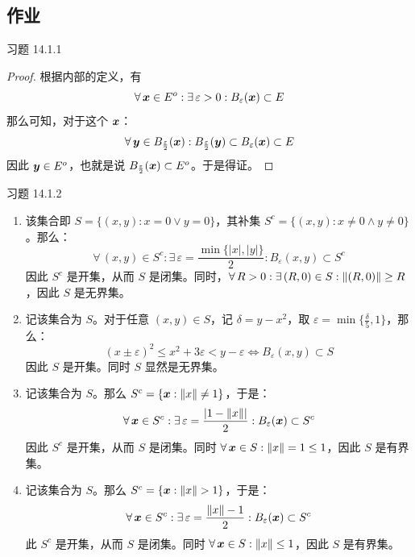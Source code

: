 \subsection{作业}

\begin{problem}
    习题 14.1.1
    \begin{proof}
        根据内部的定义，有
        $$
        \forall\,\boldsymbol{x} \in E^o: \exists\,\varepsilon > 0: B_{\varepsilon}(\boldsymbol{x}) \subset E
        $$
        那么可知，对于这个 $\boldsymbol{x}$：
        $$
        \forall\,\boldsymbol{y} \in B_{\frac{\varepsilon}{2}}(\boldsymbol{x}): B_{\frac{\varepsilon}{2}}(\boldsymbol{y}) \subset B_{\varepsilon}(\boldsymbol{x}) \subset E
        $$
        因此 $\boldsymbol{y} \in E^o$，也就是说 $B_{\frac{\varepsilon}{2}}(\boldsymbol{x}) \subset E^o$。于是得证。
    \end{proof}
\end{problem}

\begin{problem}
    习题 14.1.2
    \begin{solution}
        \begin{enumerate}
            \item[\textbf{1)}] 该集合即 $S = \{(x, y): x = 0 \lor y = 0\}$，其补集 $S^c = \{(x, y): x \neq 0 \land y \neq 0\}$。那么：
            $$
            \forall\,(x, y) \in S^c: \exists\,\varepsilon = \frac{\min\{|x|, |y|\}}{2}: B_{\varepsilon}(x, y) \subset S^c
            $$
            因此 $S^c$ 是开集，从而 $S$ 是闭集。同时，$\forall\,R > 0: \exists\, (R, 0) \in S: \norm{(R, 0)} \ge R$，因此 $S$ 是无界集。
            
            \item[\textbf{2)}] 记该集合为 $S$。对于任意 $(x, y) \in S$，记 $\delta = y - x^2$，取 $\varepsilon = \min\{\frac{\delta}{5}, 1\}$，那么：
            $$
            (x \pm \varepsilon)^2 \le x^2 + 3 \varepsilon < y - \varepsilon \iff B_{\varepsilon}(x, y) \subset S
            $$
            因此 $S$ 是开集。同时 $S$ 显然是无界集。

            \item[\textbf{3)}] 记该集合为 $S$。那么 $S^c = \{\boldsymbol{x}: \norm{x} \neq 1\}$，于是：
            $$
            \forall\,\boldsymbol{x} \in S^c: \exists\,\varepsilon = \frac{\abs{1 - \norm{x}}}{2}: B_{\varepsilon}(\boldsymbol{x}) \subset S^c
            $$
            因此 $S^c$ 是开集，从而 $S$ 是闭集。同时 $\forall\,\boldsymbol{x} \in S: \norm{x} = 1 \le 1$，因此 $S$ 是有界集。

            \item[\textbf{4)}] 记该集合为 $S$。那么 $S^c = \{\boldsymbol{x}: \norm{x} > 1\}$，于是：
            $$
            \forall\,\boldsymbol{x} \in S^c: \exists\,\varepsilon = \frac{\norm{x} - 1}{2}: B_{\varepsilon}(\boldsymbol{x}) \subset S^c
            $$
            此 $S^c$ 是开集，从而 $S$ 是闭集。同时 $\forall\,\boldsymbol{x} \in S: \norm{x} \le 1$，因此 $S$ 是有界集。
        \end{enumerate}
    \end{solution}
\end{problem}

